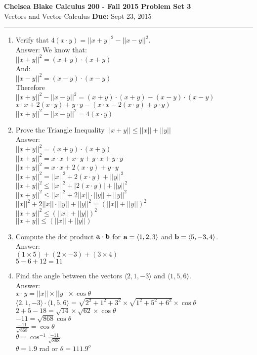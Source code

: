 \documentclass[11pt]{article}
\newcommand{\hwheadings}[3]{
{\bf Chelsea Blake Calculus 200 -  Fall 2015} \hfill {{\bf Problem Set #1}}\\
{{\bf } #2} \hfill {{\bf Due:} #3} \\
\rule[0.1in]{\textwidth}{0.025in}
}
\begin{document}
\hwheadings{3}{Vectors and Vector Calculus }{Sept 23, 2015}


\begin{enumerate}

 \item Verify that $4(x \cdot y) = || x+y||^2 - ||x-y||^2$.
 \\
 Answer: We know that:
 \\
 $|| x+y||^2=(x+y) \cdot (x+y)$
 \\
 And:
 \\
 $ ||x-y||^2 = (x-y) \cdot (x-y)$
 \\
 Therefore
 \\
 $|| x+y||^2 - ||x-y||^2= (x+y) \cdot (x+y) -  (x-y) \cdot (x-y)$
 \\
 $x \cdot x + 2(x \cdot y) + y \cdot y - (x \cdot x - 2(x \cdot y) + y \cdot y)$
 \\
  $|| x+y||^2 - ||x-y||^2= 4(x \cdot y)$

 \item Prove the Triangle Inequality $||x+y|| \le ||x|| + ||y||$ 
 \\
 Answer:
 \\
 $||x+y||^2=(x+y) \cdot (x+y)$
 \\
  $||x+y||^2= x \cdot x + x \cdot y + y \cdot x + y \cdot y$
  \\
   $||x+y||^2= x \cdot x + 2(x \cdot y)+ y \cdot y$
   \\
    $||x+y||^2= ||x||^2 + 2(x \cdot y) + ||y||^2$
    \\
    $||x+y||^2 \le ||x||^2 + |2(x \cdot y)| + ||y||^2$
    \\
    $||x+y||^2 \le ||x||^2 + 2 ||x|| \cdot ||y|| + ||y||^2$
 \\
 $||x||^2 + 2 ||x|| \cdot ||y|| + ||y||^2 = (||x||+||y||)^2$
 \\
 $||x+y||^2 \le (||x||+||y||)^2$
 \\
  $||x+y|| \le (||x||+||y||)$
 
 
 \item Compute the dot product ${\bf a} \cdot {\bf b}$ for ${\bf a} = \langle 1,2,3 \rangle$ and ${\bf b} = \langle 5,-3,4 \rangle$.
 \\
 Answer:
 \\
 $(1 \times 5)+ (2 \times -3)+ (3 \times 4)$
 \\
 $5-6+12=11$
 
 
 \item Find the angle between the vectors $\langle 2,1,-3 \rangle$ and $ \langle 1,5,6 \rangle$.
 \\
 Answer:
 \\
 $x \cdot y = ||x|| \times ||y|| \times \cos \theta$
 \\
 $\langle 2,1,-3 \rangle \cdot \langle 1,5,6 \rangle = \sqrt{2^2+1^2+3^2} \times \sqrt{1^2+5^2+6^2} \times \cos \theta $
 \\
 $2+5-18= \sqrt{14} \times \sqrt{62} \times \cos \theta $
 \\
 $-11=\sqrt{868} \cos \theta$
 \\
 $\frac{-11}{\sqrt{868}}= \cos \theta $
 \\
 $\theta= \cos^{-1}\frac{-11}{\sqrt{868}} $
 \\
 $\theta= 1.9$ rad or $\theta = 111.9^{o} $
 

\end{enumerate}
\end{document}
